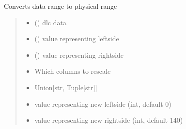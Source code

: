 \documentclass[letterpaper,10pt,english]{sphinxmanual}
\begin{document}
\begin{fulllineitems}
\begin{fulllineitems}
\label{\detokenize{BurrowFearConditioning:BurrowFearConditioning.DeepLabData.convert_dataframe_to_physical_units}}
\pysigstartsignatures
{}
\pysigstopsignatures
\sphinxAtStartPar
Converts data range to physical range
\begin{quote}\begin{description}
\begin{itemize}
\item {} 
\sphinxAtStartPar
{} () \textendash{} dlc data

\item {} 
\sphinxAtStartPar
{} () \textendash{} value representing left\sphinxhyphen{}side

\item {} 
\sphinxAtStartPar
{} () \textendash{} value representing right\sphinxhyphen{}side

\item {} 
\sphinxAtStartPar
{} \textendash{} Which columns to rescale

\item {} 
\sphinxAtStartPar
{} \textendash{} Union{[}str, Tuple{[}str{]}{]}

\item {} 
\sphinxAtStartPar
{} \textendash{} value representing new left\sphinxhyphen{}side (int, default 0)

\item {} 
\sphinxAtStartPar
{} \textendash{} value representing new right\sphinxhyphen{}side (int, default 140)


\end{itemize}
\end{description}
\end{quote}
\end{fulllineitems}
\end{fulllineitems}
\end{document}
